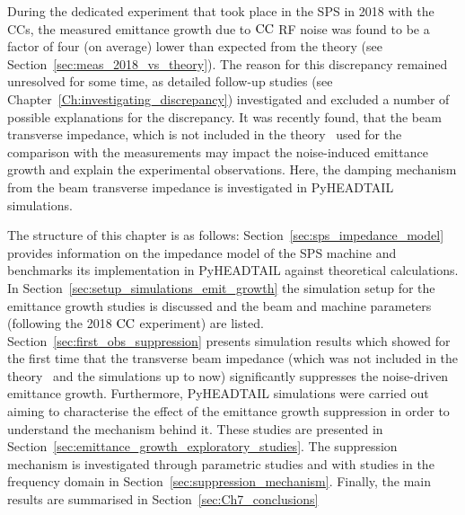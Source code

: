 \thispagestyle{simple} %
During the dedicated experiment that took place in the SPS
in 2018 with the CCs, the measured emittance
growth due to ${\mathrm{CC}}$ RF noise was found to be a factor of four (on average) lower than expected from the theory (see Section~\ref{sec:meas_2018_vs_theory}). The reason for this discrepancy remained unresolved for some time, as detailed follow-up studies (see Chapter~\ref{Ch:investigating_discrepancy}) investigated and excluded a number of possible explanations for the discrepancy.
It was recently found, that the beam transverse impedance, which is not included in the theory~\cite{PhysRevSTAB.18.101001} used for the comparison with the measurements may impact the noise-induced emittance growth and explain the experimental observations. Here, the damping mechanism from the beam transverse impedance is investigated in PyHEADTAIL simulations.

The structure of this chapter is as follows: Section~\ref{sec:sps_impedance_model} provides information on the impedance model of the SPS machine and benchmarks its implementation in PyHEADTAIL against theoretical calculations. In Section~\ref{sec:setup_simulations_emit_growth} the simulation setup for the emittance growth studies is discussed and the beam and machine parameters (following the 2018 ${\mathrm{CC}}$ experiment) are listed. Section~\ref{sec:first_obs_suppression} presents simulation results which showed for the first time that the transverse beam impedance (which was not included in the theory~\cite{PhysRevSTAB.18.101001} and the simulations up to now) significantly suppresses the noise-driven emittance growth. Furthermore, PyHEADTAIL simulations were carried out aiming to characterise the effect of the emittance growth suppression in order to understand the mechanism behind it. These studies are presented in Section~\ref{sec:emittance_growth_exploratory_studies}. The suppression mechanism is investigated through parametric studies and with studies in the frequency domain in Section~\ref{sec:suppression_mechanism}. Finally, the main results are summarised in Section~\ref{sec:Ch7_conclusions}


